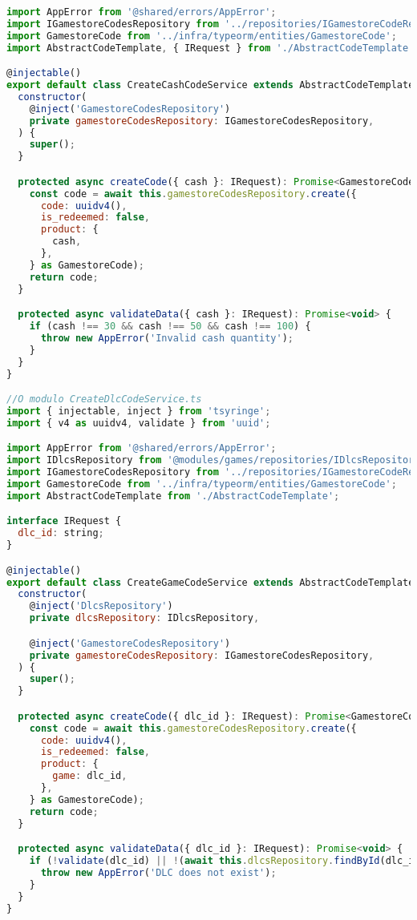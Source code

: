 \begin{lstlisting}[language=JavaScript, caption={Implementação de acordo com o OCP},captionpos=b, label=alg:ocpexample]
import AppError from '@shared/errors/AppError';
import IGamestoreCodesRepository from '../repositories/IGamestoreCodeRepository';
import GamestoreCode from '../infra/typeorm/entities/GamestoreCode';
import AbstractCodeTemplate, { IRequest } from './AbstractCodeTemplate';

@injectable()
export default class CreateCashCodeService extends AbstractCodeTemplate {
  constructor(
    @inject('GamestoreCodesRepository')
    private gamestoreCodesRepository: IGamestoreCodesRepository,
  ) {
    super();
  }

  protected async createCode({ cash }: IRequest): Promise<GamestoreCode> {
    const code = await this.gamestoreCodesRepository.create({
      code: uuidv4(),
      is_redeemed: false,
      product: {
        cash,
      },
    } as GamestoreCode);
    return code;
  }

  protected async validateData({ cash }: IRequest): Promise<void> {
    if (cash !== 30 && cash !== 50 && cash !== 100) {
      throw new AppError('Invalid cash quantity');
    }
  }
}

//O modulo CreateDlcCodeService.ts
import { injectable, inject } from 'tsyringe';
import { v4 as uuidv4, validate } from 'uuid';

import AppError from '@shared/errors/AppError';
import IDlcsRepository from '@modules/games/repositories/IDlcsRepository';
import IGamestoreCodesRepository from '../repositories/IGamestoreCodeRepository';
import GamestoreCode from '../infra/typeorm/entities/GamestoreCode';
import AbstractCodeTemplate from './AbstractCodeTemplate';

interface IRequest {
  dlc_id: string;
}

@injectable()
export default class CreateGameCodeService extends AbstractCodeTemplate {
  constructor(
    @inject('DlcsRepository')
    private dlcsRepository: IDlcsRepository,

    @inject('GamestoreCodesRepository')
    private gamestoreCodesRepository: IGamestoreCodesRepository,
  ) {
    super();
  }

  protected async createCode({ dlc_id }: IRequest): Promise<GamestoreCode> {
    const code = await this.gamestoreCodesRepository.create({
      code: uuidv4(),
      is_redeemed: false,
      product: {
        game: dlc_id,
      },
    } as GamestoreCode);
    return code;
  }

  protected async validateData({ dlc_id }: IRequest): Promise<void> {
    if (!validate(dlc_id) || !(await this.dlcsRepository.findById(dlc_id))) {
      throw new AppError('DLC does not exist');
    }
  }
}
  \end{lstlisting}